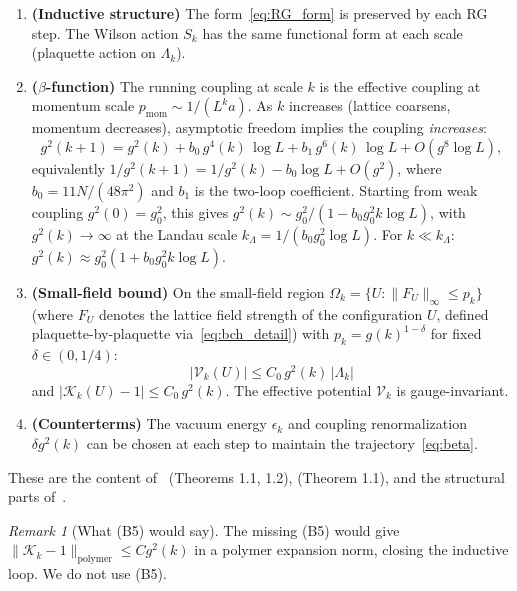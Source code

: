 \documentclass[11pt,a4paper]{article}
\theoremstyle{plain}
\theoremstyle{definition}
\theoremstyle{remark}
\newtheorem{remark}[theorem]{Remark}
\newcommand{\cV}{\mathcal{V}}
\newcommand{\cK}{\mathcal{K}}
\begin{document}
\begin{enumerate}[label=\textbf{(B\arabic*)}]
  \item \textbf{(Inductive structure)}
    The form~\eqref{eq:RG_form} is preserved by each RG
    step. The Wilson action $S_k$ has the same functional
    form at each scale (plaquette action on $\Lambda_k$).
    
  \item \textbf{($\beta$-function)}
    The running coupling at scale $k$ is the effective
    coupling at momentum scale $p_{\mathrm{mom}} \sim 1/(L^k a)$.
    As $k$ increases (lattice coarsens, momentum decreases),
    asymptotic freedom implies the coupling \emph{increases}:
    \begin{equation}\label{eq:beta}
      g^2(k+1) = g^2(k) + b_0\,g^4(k)\,\log L
      + b_1\,g^6(k)\,\log L + O(g^8 \log L),
    \end{equation}
    equivalently $1/g^2(k+1) = 1/g^2(k) - b_0\log L + O(g^2)$,
    where $b_0 = 11N/(48\pi^2)$ and $b_1$ is the two-loop
    coefficient.  Starting from weak coupling $g^2(0) = g_0^2$,
    this gives
    $g^2(k) \sim g_0^2/(1 - b_0 g_0^2 k\log L)$,
    with $g^2(k) \to \infty$ at the Landau scale
    $k_\Lambda = 1/(b_0 g_0^2 \log L)$.
    For $k \ll k_\Lambda$: $g^2(k) \approx g_0^2(1 + b_0 g_0^2 k \log L)$.
    
  \item \textbf{(Small-field bound)}
    On the small-field region
    $\Omega_k = \{U : \|F_U\|_\infty \le p_k\}$
    (where $F_U$ denotes the lattice field strength
    of the configuration $U$, defined plaquette-by-plaquette
    via~\eqref{eq:bch_detail})
    with $p_k = g(k)^{1-\delta}$ for fixed $\delta \in (0,1/4)$:
    \begin{equation}\label{eq:small_field}
      |\cV_k(U)| \le C_0\,g^2(k)\,|\Lambda_k|
    \end{equation}
    and
    $|\cK_k(U) - 1| \le C_0\,g^2(k)$.
    The effective potential $\cV_k$ is gauge-invariant.
    
  \item \textbf{(Counterterms)}
    The vacuum energy $\epsilon_k$ and coupling
    renormalization $\delta g^2(k)$ can be chosen at each
    step to maintain the trajectory~\eqref{eq:beta}.
\end{enumerate}

These are the content of~\cite{Bal87} (Theorems 1.1, 1.2),
\cite{Bal88a} (Theorem 1.1), and the structural parts
of~\cite{Bal88b,Bal89}.

\begin{remark}[What (B5) would say]
The missing (B5) would give
$\|\cK_k - 1\|_{\mathrm{polymer}} \le C g^2(k)$
in a polymer expansion norm, closing the inductive loop.
We do not use (B5).
\end{remark}
\end{document}
